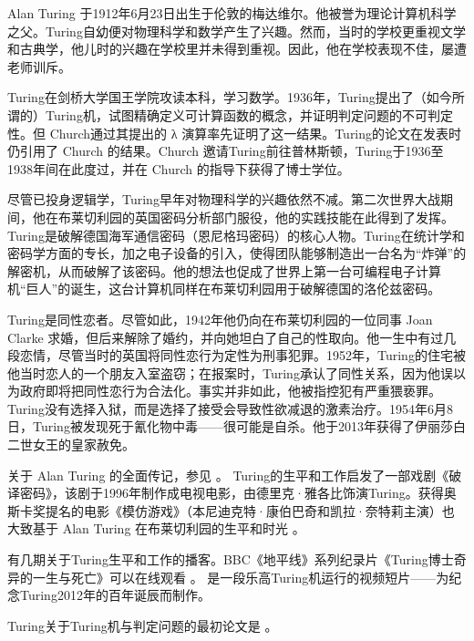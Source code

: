 \documentclass[../../../include/open-logic-section]{subfiles}
\begin{document}


Alan Turing 于1912年6月23日出生于伦敦的梅达维尔。他被誉为理论计算机科学之父。Turing自幼便对物理科学和数学产生了兴趣。然而，当时的学校更重视文学和古典学，他儿时的兴趣在学校里并未得到重视。因此，他在学校表现不佳，屡遭老师训斥。


Turing在剑桥大学国王学院攻读本科，学习数学。1936年，Turing提出了（如今所谓的）Turing机，试图精确定义可计算函数的概念，并证明判定问题的不可判定性。但 Church通过其提出的 λ 演算率先证明了这一结果。Turing的论文在发表时仍引用了 Church 的结果。Church 邀请Turing前往普林斯顿，Turing于1936至1938年间在此度过，并在 Church 的指导下获得了博士学位。

尽管已投身逻辑学，Turing早年对物理科学的兴趣依然不减。第二次世界大战期间，他在布莱切利园的英国密码分析部门服役，他的实践技能在此得到了发挥。Turing是破解德国海军通信密码（恩尼格玛密码）的核心人物。Turing在统计学和密码学方面的专长，加之电子设备的引入，使得团队能够制造出一台名为“炸弹”的解密机，从而破解了该密码。他的想法也促成了世界上第一台可编程电子计算机“巨人”的诞生，这台计算机同样在布莱切利园用于破解德国的洛伦兹密码。

Turing是同性恋者。尽管如此，1942年他仍向在布莱切利园的一位同事 Joan Clarke 求婚，但后来解除了婚约，并向她坦白了自己的性取向。他一生中有过几段恋情，尽管当时的英国将同性恋行为定性为刑事犯罪。1952年，Turing的住宅被他当时恋人的一个朋友入室盗窃；在报案时，Turing承认了同性关系，因为他误以为政府即将把同性恋行为合法化。事实并非如此，他被指控犯有严重猥亵罪。Turing没有选择入狱，而是选择了接受会导致性欲减退的激素治疗。1954年6月8日，Turing被发现死于氰化物中毒——很可能是自杀。他于2013年获得了伊丽莎白二世女王的皇家赦免。

\begin{reading}
关于 Alan Turing 的全面传记，参见 \citet{Hodges2014}。
Turing的生平和工作启发了一部戏剧《破译密码》，该剧于1996年制作成电视电影，由德里克·雅各比饰演Turing。获得奥斯卡奖提名的电影《模仿游戏》（本尼迪克特·康伯巴奇和凯拉·奈特莉主演）也大致基于 Alan Turing 在布莱切利园的生平和时光 \citep{Imitation2014}。

\citet{Radiolab2012} 有几期关于Turing生平和工作的播客。BBC《地平线》系列纪录片《Turing博士奇异的一生与死亡》可以在线观看 \citep{Sykes1992}。
\citep{Theelen2012} 是一段乐高Turing机运行的视频短片——为纪念Turing2012年的百年诞辰而制作。

Turing关于Turing机与判定问题的最初论文是 \citet{Turing1937}。
\end{reading}
\end{document}
